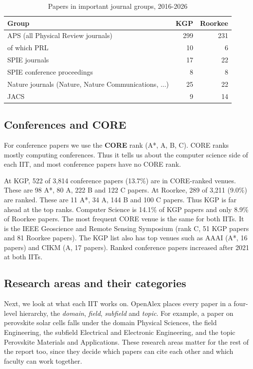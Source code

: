 \documentclass[conference,10pt]{IEEEtran}
\begin{document}
\begin{table}[!t]
\centering
\caption{Papers in important journal groups, 2016-2026}
\label{tab:important}
\footnotesize
\begin{tabular}{@{}lrr@{}}
\toprule
\textbf{Group} & \textbf{KGP} & \textbf{Roorkee} \\
\midrule
APS (all Physical Review journals) & 299 & 231 \\
\quad of which PRL & 10 & 6 \\
SPIE journals & 17 & 22 \\
SPIE conference proceedings & 8 & 8 \\
Nature journals (Nature, Nature Communications, ...) & 25 & 22 \\
JACS & 9 & 14 \\
\bottomrule
\end{tabular}
\end{table}

\subsection{Conferences and CORE}
For conference papers we use the \textbf{CORE} rank (A*, A, B, C). CORE ranks mostly computing conferences. Thus it
tells us about the computer science side of each IIT, and most conference papers have no CORE rank.

At KGP, 522 of 3,814 conference papers (13.7\%) are in CORE-ranked venues. These are 98 A*, 80 A, 222 B and 122 C
papers. At Roorkee, 289 of 3,211 (9.0\%) are ranked. These are 11 A*, 34 A, 144 B and 100 C papers. Thus KGP is far
ahead at the top ranks. Computer Science is 14.1\% of KGP papers and only 8.9\% of Roorkee
papers. The most frequent CORE venue is the same for both IITs. It is the IEEE Geoscience and Remote Sensing
Symposium (rank C, 51 KGP papers and 81 Roorkee papers). The KGP list also has top venues such as AAAI (A*, 16
papers) and CIKM (A, 17 papers). Ranked conference papers increased after 2021 at both IITs.

\subsection{Research areas and their categories}
Next, we look at what each IIT works on. OpenAlex places every paper in a four-level hierarchy, the
\textit{domain}, \textit{field}, \textit{subfield} and \textit{topic}. For example, a paper on perovskite solar cells falls under the domain Physical Sciences, the field Engineering, the subfield Electrical and Electronic Engineering, and the topic Perovskite Materials and Applications. These research areas matter for the rest of the report too, since they decide which papers can cite each other and which faculty can work together.
\end{document}
